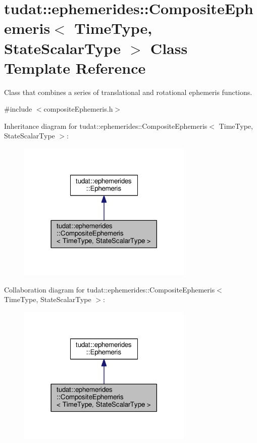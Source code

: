 \hypertarget{classtudat_1_1ephemerides_1_1CompositeEphemeris}{}\section{tudat\+:\+:ephemerides\+:\+:Composite\+Ephemeris$<$ Time\+Type, State\+Scalar\+Type $>$ Class Template Reference}
\label{classtudat_1_1ephemerides_1_1CompositeEphemeris}


Class that combines a series of translational and rotational ephemeris functions.  




{\ttfamily \#include $<$composite\+Ephemeris.\+h$>$}



Inheritance diagram for tudat\+:\+:ephemerides\+:\+:Composite\+Ephemeris$<$ Time\+Type, State\+Scalar\+Type $>$\+:
\nopagebreak
\begin{figure}[H]
\begin{center}
\leavevmode
\includegraphics[width=237pt]{classtudat_1_1ephemerides_1_1CompositeEphemeris__inherit__graph}
\end{center}
\end{figure}


Collaboration diagram for tudat\+:\+:ephemerides\+:\+:Composite\+Ephemeris$<$ Time\+Type, State\+Scalar\+Type $>$\+:
\nopagebreak
\begin{figure}[H]
\begin{center}
\leavevmode
\includegraphics[width=237pt]{classtudat_1_1ephemerides_1_1CompositeEphemeris__coll__graph}
\end{center}
\end{figure}
